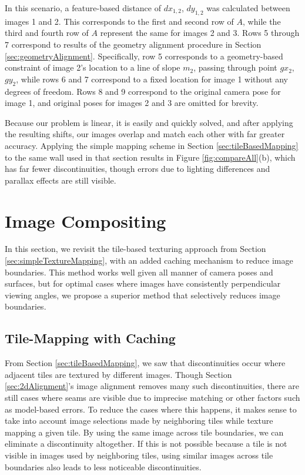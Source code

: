 \documentclass[]{spie}  %
\begin{document}
In this scenario, a feature-based distance of $dx_{1,2}$, $dy_{1,2}$
was calculated between images 1 and 2. This corresponds to the first
and second row of $A$, while the third and fourth row of $A$ represent
the same for images 2 and 3. Rows 5 through 7 correspond to results of
the geometry alignment procedure in Section
\ref{sec:geometryAlignment}. Specifically, row 5 corresponds to a
geometry-based constraint of image 2's location to a line of slope
$m_2$, passing through point $gx_2$, $gy_2$, while rows 6 and 7
correspond to a fixed location for image 1 without any degrees of
freedom. Rows 8 and 9 correspond to the original camera pose for image
1, and original poses for images 2 and 3 are omitted for brevity.

Because our problem is linear, it is easily and quickly solved, and
after applying the resulting shifts, our images overlap and match each
other with far greater accuracy. Applying the simple mapping scheme in
Section \ref{sec:tileBasedMapping} to the same wall used in that
section results in Figure \ref{fig:compareAll}(b), which has far fewer
discontinuities, though errors due to lighting differences and
parallax effects are still visible.

\section{Image Compositing}
\label{sec:imageCompositing}
In this section, we revisit the tile-based texturing approach from
Section \ref{sec:simpleTextureMapping}, with an added caching
mechanism to reduce image boundaries. This method works well given all
manner of camera poses and surfaces, but for optimal cases where
images have consistently perpendicular viewing angles, we propose a
superior method that selectively reduces image boundaries.

\subsection{Tile-Mapping with Caching}
\label{sec:mappingWithCaching}
From Section \ref{sec:tileBasedMapping}, we saw that discontinuities
occur where adjacent tiles are textured by different images. Though
Section \ref{sec:2dAlignment}'s image alignment removes many such
discontinuities, there are still cases where seams are visible due to
imprecise matching or other factors such as model-based errors. To
reduce the cases where this happens, it makes sense to take into
account image selections made by neighboring tiles while texture
mapping a given tile. By using the same image across tile boundaries,
we can eliminate a discontinuity altogether. If this is not possible
because a tile is not visible in images used by neighboring tiles,
using similar images across tile boundaries also leads to less
noticeable discontinuities.
\end{document}
